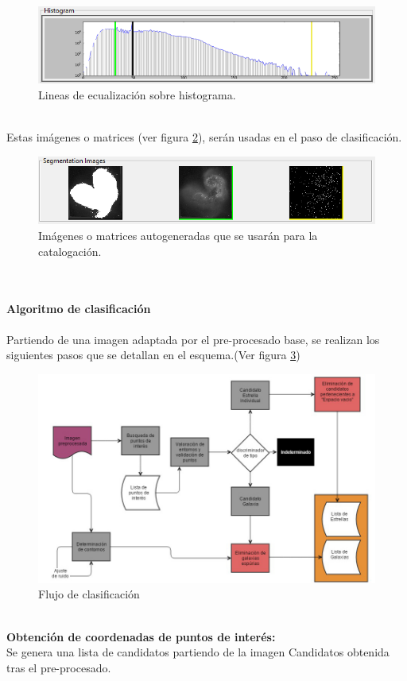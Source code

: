 	\begin{figure}[!htb]
		\centering
		\includegraphics[width=1\textwidth]{images/histLines.png}
		\caption{\label{fig:histLines}{\small Lineas de ecualización sobre histograma.}}
	\end{figure}
	\\
	Estas imágenes o matrices  (ver figura \ref{fig:imagenesAutoGeneradas}), serán usadas en el paso de clasificación.
	\begin{figure}[!htb]
		\centering
		\includegraphics[width=1\textwidth]{images/imagenesAutoGeneradas.png}
		\caption{\label{fig:imagenesAutoGeneradas}{\small Imágenes o matrices autogeneradas que se usarán para la catalogación.}}
	\end{figure}
	\\
	\newpage
	\paragraph{Algoritmo de clasificación}
	Partiendo de una imagen adaptada por el pre-procesado base, se realizan los siguientes pasos que se detallan en el esquema.(Ver figura \ref{fig:esquemaClasificaciosn})\\
	\begin{figure}[!htb]
		\centering
		\includegraphics[width=1\textwidth]{images/tfg2016algoritmos_de_catalogaci_n.jpg}
		\caption{\label{fig:esquemaClasificaciosn}Flujo de clasificación}
	\end{figure}
	\\
	\textbf{Obtención de coordenadas de puntos de interés:} \\
	Se genera una lista de candidatos partiendo de la imagen {\scriptsize Candidatos} obtenida tras el pre-procesado.
	
